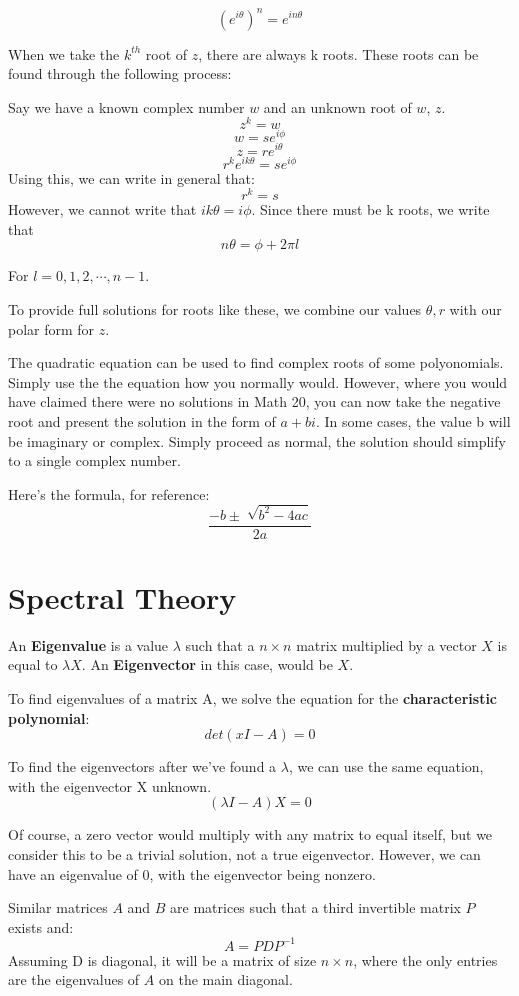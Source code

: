 \documentclass{article}
\begin{document}
\[{(e^{i\theta})}^n = e^{in\theta}\]

When we take the $k^{th}$ root of $z$, there are always 
k roots.
These roots can be found through the following process: \par  
Say we have a known complex number $w$ and an unknown root of $w$, $z$.
\[z^k = w\]
\[w=se^{i\phi}\]
\[z=re^{i\theta}\]
\[r^k e^{ik\theta}=se^{i\phi}\]
Using this, we can write in general that:
\[r^k=s\]
\newpage
However, we cannot write that ${ik\theta}={i\phi}$. Since there
must be k roots, we write that
\[n\theta = \phi+2\pi l\]
\begin{center}
For $l = 0,1,2,\dotsb,n-1$.
\end{center}
To provide full solutions for roots like these, we combine our values $\theta, r$ with our
polar form for $z$.
\par 

\par 
The quadratic equation can be used to find complex roots of some polyonomials.
Simply use the the equation how you normally would. However, where you would have 
claimed there were no solutions in Math 20, you can now take the negative root and
present the solution in the form of $a+bi$.
In some cases, the value b will be imaginary or complex. Simply proceed as normal,
the solution should simplify to a single complex number.
\par 
Here's the formula, for reference:
\[\frac{-b\pm \sqrt[]{b^2-4ac}}{2a}\]
\section{Spectral Theory}
An \textbf{Eigenvalue} is a value $\lambda$ such that a $n\times n$ matrix 
multiplied by a vector $X$ is equal to $\lambda X$. An \textbf{Eigenvector} 
in this case, would be $X$.
\par To find eigenvalues of a matrix A, we solve the equation for the \textbf{characteristic polynomial}:
\[det(xI-A)=0\]
\par To find the eigenvectors after we've found a $\lambda$, we can use the same 
equation, with the eigenvector X unknown.
\[(\lambda I - A)X=0\]
\par Of course, a zero vector would multiply with any matrix to equal itself, but we consider this to be a trivial solution, not a
true eigenvector. However, we can have an eigenvalue of 0, with the eigenvector being nonzero.
\par 
Similar matrices $A$ and $B$ are matrices such that a third invertible matrix
$P$ exists and:
\[A=P D P^{-1}\]
Assuming D is diagonal, it will be a matrix of size $n\times n$, where the only
entries are the eigenvalues of $A$ on the main diagonal.
\end{document}
